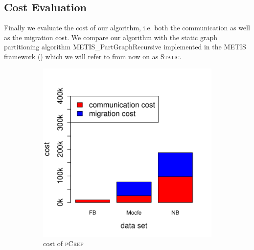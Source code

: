 \documentclass[a4paper,UKenglish,cleveref, autoref, thm-restate,authorcolumns]{lipics-v2019}
\newcommand{\adjDel}{\textsc{pCrep}}
\newcommand{\static}{\textsc{Static}}
\begin{document}
\subsection{Cost Evaluation}

Finally we evaluate the cost of our algorithm, i.e. both the communication as well 
as the migration cost. We compare our algorithm with the static graph partitioning algorithm METIS\_PartGraphRecursive implemented in the METIS framework (\cite{Karypis1998, Karypis1998a}) which we will refer to from now on as \static{}.

\begin{figure}[h]
	\centering
	\begin{minipage}{0.48\linewidth}
		\begin{subfigure}[b]{\linewidth}
			\includegraphics*[width=\linewidth]{"plots/plot_cost_decompTree"}
			\caption{cost of \adjDel}
		\end{subfigure}		
	\end{minipage}
	\begin{minipage}{0.48\linewidth}
		\begin{subfigure}[b]{\linewidth}

\end{subfigure}
\end{minipage}
\end{figure}
\end{document}
